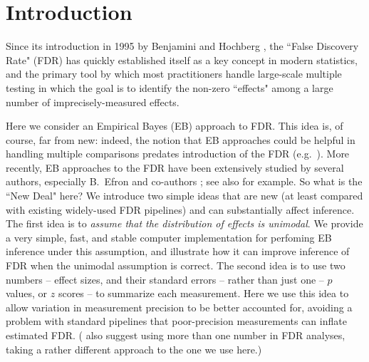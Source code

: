 \documentclass[11pt]{article}
\begin{document}

\section*{Introduction}

Since its introduction in 1995 by Benjamini and Hochberg 
\cite{benjamini1995controlling}, the ``False Discovery Rate" (FDR) has quickly established itself
as a key concept in modern statistics, and the primary tool by which most practitioners handle large-scale multiple testing
in which the goal is to identify the non-zero ``effects" among a large number of imprecisely-measured effects.

Here we consider an Empirical Bayes (EB) approach to FDR. This idea is, of course, far from new:
indeed, the notion that EB approaches could be helpful in handling multiple comparisons predates introduction of
the FDR  (e.g.~\cite{greenland1991empirical}). More recently, EB approaches to the FDR
have been extensively studied by several authors, 
especially B.~Efron and co-authors 
\cite{efron2001empirical, efron2002empirical,efron2003robbins,efron2008microarrays,efron2010large}; 
see also \cite{kendziorski2003parametric,newton2004detecting, 
datta2005empirical,muralidharan2010empirical} for example.
So what is the ``New Deal" here? We introduce two simple ideas that are new (at least compared with
existing widely-used FDR pipelines) and can substantially affect
inference. The first idea is to {\it assume that the distribution of effects is unimodal}.  We provide a very simple, fast, and stable computer 
implementation for perfoming EB inference under this assumption, and illustrate how it can improve inference of FDR when the unimodal assumption is correct.  
The second idea is to use two numbers -- effect sizes, and their standard errors -- rather than just one -- $p$ values, or $z$ scores -- 
to summarize each measurement. Here we use this idea to allow variation in measurement precision to be better accounted for,
 avoiding a problem with standard pipelines that poor-precision measurements can inflate estimated FDR.
(\cite{ploner2006multidimensional} also suggest using more than one number in FDR analyses, taking a
rather different approach to the one we use here.)
\end{document}
